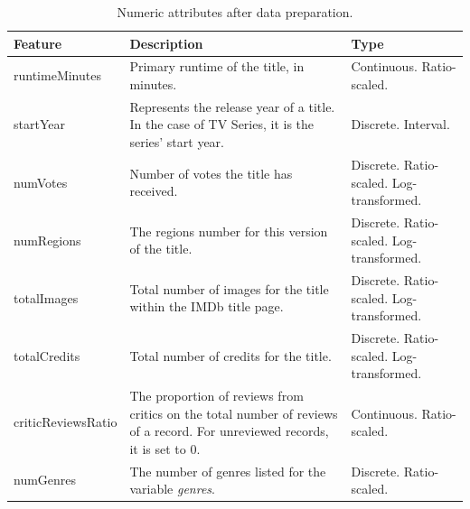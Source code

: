 \begin{table}
    \centering
    \renewcommand{\arraystretch}{1.2}
    \scriptsize
    \begin{tabular}{p{2.5cm}p{7cm}p{4.5cm}}
    \toprule
    \textbf{Feature} & \textbf{Description} & \textbf{Type} \\
    \midrule
    runtimeMinutes & Primary runtime of the title, in minutes. & Continuous. Ratio-scaled. \\
    startYear & Represents the release year of a title. In the case of TV Series, it is the series’ start year. & Discrete. Interval. \\
    numVotes & Number of votes the title has received. & Discrete. Ratio-scaled. Log-transformed. \\
    numRegions & The regions number for this version of the title. & Discrete. Ratio-scaled. Log-transformed. \\
    totalImages & Total number of images for the title within the IMDb title page. & Discrete. Ratio-scaled. Log-transformed. \\
    totalCredits & Total number of credits for the title. & Discrete. Ratio-scaled. Log-transformed. \\
    criticReviewsRatio & The proportion of reviews from critics on the total number of reviews of a record. For unreviewed records, it is set to 0. & Continuous. Ratio-scaled. \\
    numGenres & The number of genres listed for the variable \textit{genres}. & Discrete. Ratio-scaled. \\ \bottomrule
    \end{tabular}
    \caption{Numeric attributes after data preparation.}
    \label{tab:dataset_numeric}
\end{table}


